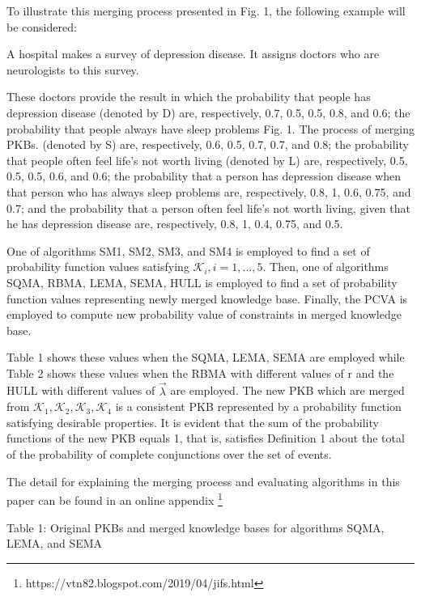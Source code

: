 \documentclass[10pt,a4paper]{IOS-Book-Article}
\begin{document}
To illustrate this merging process presented in Fig. 1, the following example will be considered: 

A hospital makes a survey of depression disease. It assigns doctors who are neurologists to this survey. 

These doctors provide the result in which the probability that people has depression disease (denoted by D) are, respectively, 0.7, 0.5, 0.5, 0.8, and 0.6; the probability that people always have sleep problems Fig. 1. The process of merging PKBs.
(denoted by S) are, respectively, 0.6, 0.5, 0.7, 0.7, and 0.8; the probability that people often feel life’s not worth living (denoted by L) are, respectively, 0.5, 0.5, 0.5, 0.6, and 0.6; the probability that a person has depression disease when that person who has always sleep problems are, respectively, 0.8, 1, 0.6, 0.75, and 0.7; and the probability that a person often feel life’s not worth living, given that he has depression disease are, respectively, 0.8, 1, 0.4, 0.75, and 0.5. 

One of algorithms SM1, SM2, SM3, and SM4 is employed to find a set of probability function values satisfying $\mathcal{K}_i, i = 1, ..., 5$. Then, one of algorithms SQMA, RBMA, LEMA, SEMA, HULL is employed to find a set of probability function values representing newly merged knowledge base. Finally, the PCVA is employed to compute new probability value of constraints in merged knowledge base.

Table 1 shows these values when the SQMA, LEMA, SEMA are employed while Table 2 shows these values when the RBMA with different values of r and the HULL with different values of $\vec{\lambda}$ are employed. The new PKB which are merged from $\mathcal{K}_1,\mathcal{K}_2,\mathcal{K}_3,\mathcal{K}_4$ is a consistent PKB represented by a probability function satisfying desirable properties. It is evident that the sum of the probability functions of the new PKB equals 1, that is, satisfies Definition 1 about the total of the probability of complete conjunctions over the set of events. 

The detail for explaining the merging process and evaluating algorithms in this paper can be found in an online appendix \footnote{https://vtn82.blogspot.com/2019/04/jifs.html}

Table 1: Original PKBs and merged knowledge bases for algorithms SQMA, LEMA, and SEMA
\end{document}
